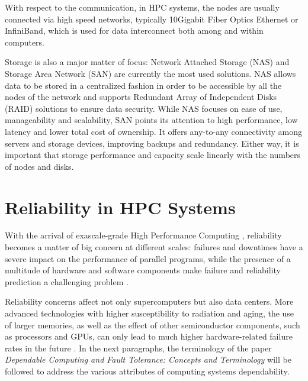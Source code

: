 With respect to the communication, in HPC systems, the nodes are usually connected via high speed networks, typically 10Gigabit Fiber Optics Ethernet or InfiniBand, which is used for data interconnect both among and within computers.

Storage is also a major matter of focus: Network Attached Storage (NAS) and Storage Area Network (SAN) are currently the most used solutions. NAS allows data to be stored in a centralized fashion in order to be accessible by all the nodes of the network and supports Redundant Array of Independent Disks (RAID) solutions to ensure data security. While NAS focuses on ease of use, manageability and scalability, SAN points its attention to high performance, low latency and lower total cost of ownership. It offers any-to-any connectivity among servers and storage devices, improving backups and redundancy. Either way, it is important that storage performance and capacity scale linearly with the numbers of nodes and disks.

\section{Reliability in HPC Systems}
With the arrival of exascale-grade High Performance Computing \cite{10.1145/3372390}, reliability becomes a matter of big concern at different scales: failures and downtimes have a severe impact on the performance of parallel programs, while the presence of a multitude of hardware and software components make failure and reliability prediction a challenging problem \cite{4629245}. 

Reliability concerns affect not only supercomputers but also data centers. More advanced technologies with higher susceptibility to radiation and aging, the use of larger memories, as well as the effect of other semiconductor components, such as processors and GPUs, can only lead to much higher hardware-related failure rates in the future \cite{10.1145/3403956}.
In the next paragraphs, the terminology of the paper \textit{Dependable Computing and Fault Tolerance: Concepts and Terminology} \cite{532603} will be followed to address  the various attributes of computing systems dependability.

